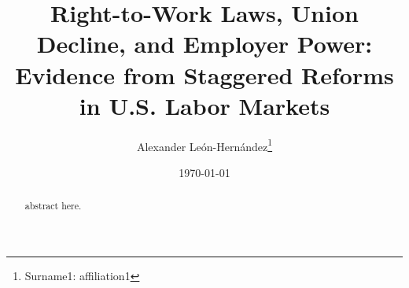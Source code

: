 \documentclass[draftmode]{Formatting/AEA}
\begin{document}
\title{Right-to-Work Laws, Union Decline, and Employer Power: Evidence from Staggered Reforms in U.S. Labor Markets}
\author{Alexander Le\'on-Hern\' andez\thanks{%
Surname1: affiliation1}}
\date{\today}
\JEL{}
\Keywords{}

\begin{abstract}
 abstract here.
\end{abstract}

\maketitle












\appendix

%
\end{document}
